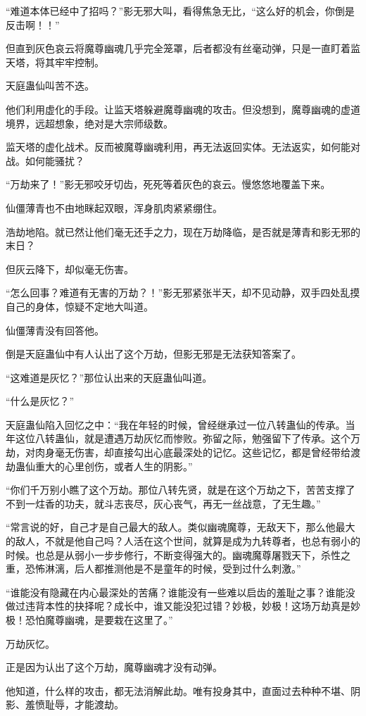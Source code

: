 \begin{this_body}
“难道本体已经中了招吗？”影无邪大叫，看得焦急无比，“这么好的机会，你倒是反击啊！！”

但直到灰色哀云将魔尊幽魂几乎完全笼罩，后者都没有丝毫动弹，只是一直盯着监天塔，将其牢牢控制。

天庭蛊仙叫苦不迭。

他们利用虚化的手段。让监天塔躲避魔尊幽魂的攻击。但没想到，魔尊幽魂的虚道境界，远超想象，绝对是大宗师级数。

监天塔的虚化战术。反而被魔尊幽魂利用，再无法返回实体。无法返实，如何能对战。如何能骚扰？

“万劫来了！”影无邪咬牙切齿，死死等着灰色的哀云。慢悠悠地覆盖下来。

仙僵薄青也不由地眯起双眼，浑身肌肉紧紧绷住。

浩劫地陷。就已然让他们毫无还手之力，现在万劫降临，是否就是薄青和影无邪的末日？

但灰云降下，却似毫无伤害。

“怎么回事？难道有无害的万劫？！”影无邪紧张半天，却不见动静，双手四处乱摸自己的身体，惊疑不定地大叫道。

仙僵薄青没有回答他。

倒是天庭蛊仙中有人认出了这个万劫，但影无邪是无法获知答案了。

“这难道是灰忆？”那位认出来的天庭蛊仙叫道。

“什么是灰忆？”

天庭蛊仙陷入回忆之中：“我在年轻的时候，曾经继承过一位八转蛊仙的传承。当年这位八转蛊仙，就是遭遇万劫灰忆而惨败。弥留之际，勉强留下了传承。这个万劫，对肉身毫无伤害，却直接勾出心底最深处的记忆。这些记忆，都是曾经带给渡劫蛊仙重大的心里创伤，或者人生的阴影。”

“你们千万别小瞧了这个万劫。那位八转先贤，就是在这个万劫之下，苦苦支撑了不到一炷香的功夫，就斗志丧尽，灰心丧气，再无一丝战意，了无生趣。”

“常言说的好，自己才是自己最大的敌人。类似幽魂魔尊，无敌天下，那么他最大的敌人，不就是他自己吗？人活在这个世间，就算是成为九转尊者，也总有弱小的时候。也总是从弱小一步步修行，不断变得强大的。幽魂魔尊屠戮天下，杀性之重，恐怖淋漓，后人都推测他是不是童年的时候，受到过什么刺激。”

“谁能没有隐藏在内心最深处的苦痛？谁能没有一些难以启齿的羞耻之事？谁能没做过违背本性的抉择呢？成长中，谁又能没犯过错？妙极，妙极！这场万劫真是妙极！恐怕魔尊幽魂，是要栽在这里了。”

万劫灰忆。

正是因为认出了这个万劫，魔尊幽魂才没有动弹。

他知道，什么样的攻击，都无法消解此劫。唯有投身其中，直面过去种种不堪、阴影、羞愤耻辱，才能渡劫。


\end{this_body}
